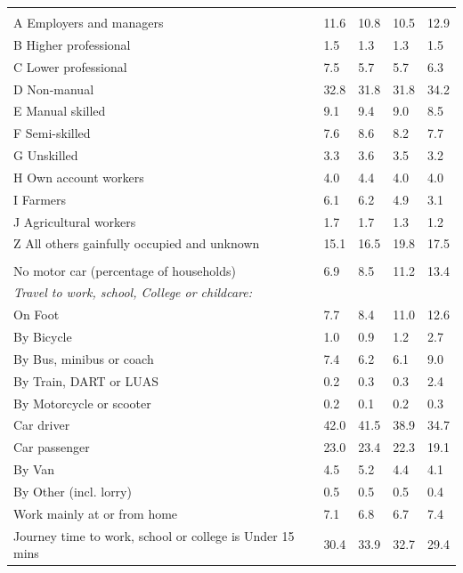 \documentclass{article}
\begin{document}
\begin{table}[h]
\begin{tabular}{KTTTT}
\hline
    \\ 
    \hline
A Employers and managers & 11.6& 10.8& 10.5& 12.9\\
B Higher professional & 1.5& 1.3& 1.3& 1.5\\
C Lower professional & 7.5& 5.7& 5.7& 6.3\\
D Non-manual & 32.8& 31.8& 31.8& 34.2\\
E Manual skilled & 9.1& 9.4& 9.0& 8.5\\
F Semi-skilled & 7.6& 8.6& 8.2& 7.7\\
G Unskilled & 3.3& 3.6& 3.5& 3.2\\
H Own account workers & 4.0& 4.4& 4.0& 4.0\\
I Farmers & 6.1& 6.2& 4.9& 3.1\\
J Agricultural workers & 1.7& 1.7& 1.3& 1.2\\
Z All others gainfully occupied and unknown & 15.1& 16.5& 19.8& 17.5\\
\hline
{}\hline
    \\ 
    \hline
No motor car (percentage of households) &  6.9&  8.5& 11.2& 
13.4\\
    \hline 
\emph{Travel to work, school, College or childcare:} & & & \\
\quad On Foot &  7.7&  8.4& 11.0& 12.6\\ 
\quad By Bicycle & 1.0& 0.9& 1.2& 2.7\\ 
\quad By Bus, minibus or coach & 7.4& 6.2& 6.1& 9.0\\
\quad By Train, DART or LUAS & 0.2& 0.3& 0.3& 2.4\\
\quad By Motorcycle or scooter & 0.2& 0.1& 0.2& 0.3\\
\quad Car driver & 42.0 & 41.5& 38.9& 34.7\\
\quad Car passenger & 23.0& 23.4& 22.3& 19.1\\
\quad By Van & 4.5& 5.2& 4.4& 4.1\\
\quad By Other (incl. lorry) & 0.5& 0.5& 0.5& 0.4\\
    \hline
Work mainly at or from home & 7.1& 6.8& 6.7& 7.4\\
Journey time to work, school or college is Under 15 mins & 30.4& 33.9& 32.7& 29.4\\

\end{tabular}
\end{table}
\end{document}
